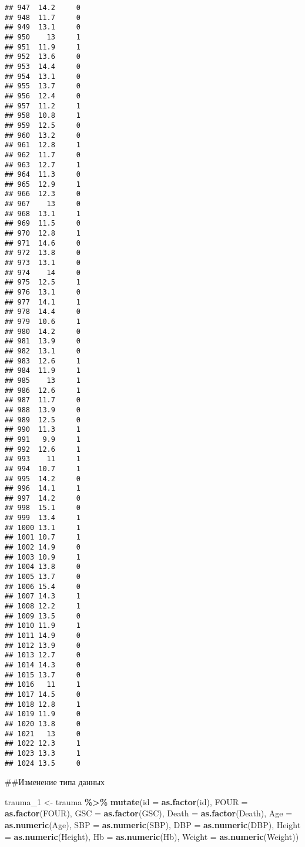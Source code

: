 \documentclass[
]{article}
\newenvironment{Shaded}{\begin{snugshade}}{\end{snugshade}}
\newcommand{\AttributeTok}[1]{\textcolor[rgb]{0.13,0.29,0.53}{#1}}
\newcommand{\FunctionTok}[1]{\textcolor[rgb]{0.13,0.29,0.53}{\textbf{#1}}}
\newcommand{\NormalTok}[1]{#1}
\newcommand{\OtherTok}[1]{\textcolor[rgb]{0.56,0.35,0.01}{#1}}
\newcommand{\SpecialCharTok}[1]{\textcolor[rgb]{0.81,0.36,0.00}{\textbf{#1}}}
\begin{document}
\begin{verbatim}
## 947  14.2     0
## 948  11.7     0
## 949  13.1     0
## 950    13     1
## 951  11.9     1
## 952  13.6     0
## 953  14.4     0
## 954  13.1     0
## 955  13.7     0
## 956  12.4     0
## 957  11.2     1
## 958  10.8     1
## 959  12.5     0
## 960  13.2     0
## 961  12.8     1
## 962  11.7     0
## 963  12.7     1
## 964  11.3     0
## 965  12.9     1
## 966  12.3     0
## 967    13     0
## 968  13.1     1
## 969  11.5     0
## 970  12.8     1
## 971  14.6     0
## 972  13.8     0
## 973  13.1     0
## 974    14     0
## 975  12.5     1
## 976  13.1     0
## 977  14.1     1
## 978  14.4     0
## 979  10.6     1
## 980  14.2     0
## 981  13.9     0
## 982  13.1     0
## 983  12.6     1
## 984  11.9     1
## 985    13     1
## 986  12.6     1
## 987  11.7     0
## 988  13.9     0
## 989  12.5     0
## 990  11.3     1
## 991   9.9     1
## 992  12.6     1
## 993    11     1
## 994  10.7     1
## 995  14.2     0
## 996  14.1     1
## 997  14.2     0
## 998  15.1     0
## 999  13.4     1
## 1000 13.1     1
## 1001 10.7     1
## 1002 14.9     0
## 1003 10.9     1
## 1004 13.8     0
## 1005 13.7     0
## 1006 15.4     0
## 1007 14.3     1
## 1008 12.2     1
## 1009 13.5     0
## 1010 11.9     1
## 1011 14.9     0
## 1012 13.9     0
## 1013 12.7     0
## 1014 14.3     0
## 1015 13.7     0
## 1016   11     1
## 1017 14.5     0
## 1018 12.8     1
## 1019 11.9     0
## 1020 13.8     0
## 1021   13     0
## 1022 12.3     1
## 1023 13.3     1
## 1024 13.5     0
\end{verbatim}

\#\#Изменение типа данных

\begin{Shaded}
\begin{Highlighting}[]
\NormalTok{trauma\_1 }\OtherTok{\textless{}{-}}\NormalTok{ trauma }\SpecialCharTok{\%\textgreater{}\%}
 \FunctionTok{mutate}\NormalTok{(}\AttributeTok{id =} \FunctionTok{as.factor}\NormalTok{(id),}
        \AttributeTok{FOUR =} \FunctionTok{as.factor}\NormalTok{(FOUR),}
        \AttributeTok{GSC =} \FunctionTok{as.factor}\NormalTok{(GSC),}
        \AttributeTok{Death =} \FunctionTok{as.factor}\NormalTok{(Death),}
        \AttributeTok{Age =} \FunctionTok{as.numeric}\NormalTok{(Age),}
        \AttributeTok{SBP =} \FunctionTok{as.numeric}\NormalTok{(SBP),}
        \AttributeTok{DBP =} \FunctionTok{as.numeric}\NormalTok{(DBP),}
        \AttributeTok{Height =} \FunctionTok{as.numeric}\NormalTok{(Height),}
        \AttributeTok{Hb =} \FunctionTok{as.numeric}\NormalTok{(Hb),}
        \AttributeTok{Weight =} \FunctionTok{as.numeric}\NormalTok{(Weight))}
\end{Highlighting}
\end{Shaded}
\end{document}
